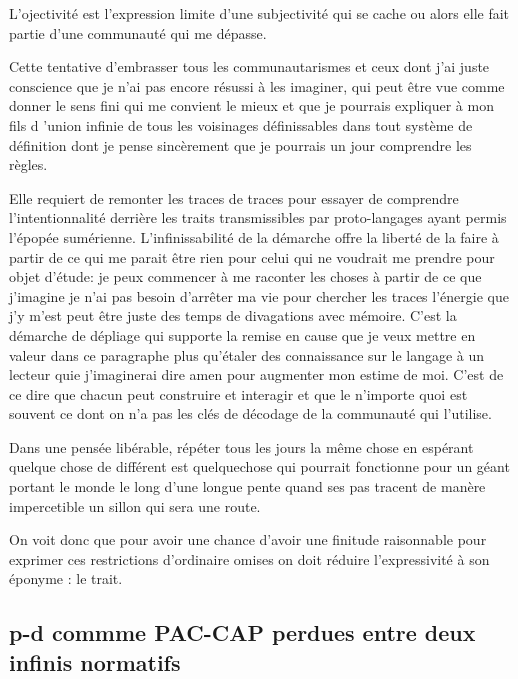 \documentclass{article}
\begin{document}
L'ojectivité est l'expression limite d'une subjectivité qui se cache ou alors elle fait partie d'une communauté qui me dépasse.  

Cette tentative d'embrasser tous les communautarismes et ceux dont j'ai juste conscience que je n'ai pas encore résussi à les imaginer, qui peut être vue comme donner le  sens fini qui me convient le mieux  et que je pourrais expliquer à mon fils d 'union infinie de tous les voisinages définissables dans tout système de définition dont je pense sincèrement que je  pourrais un jour comprendre les règles. 

Elle requiert  de remonter les traces de traces  pour essayer de comprendre l'intentionnalité derrière les traits transmissibles par proto-langages ayant permis l'épopée sumérienne. L'infinissabilité de la démarche offre la liberté de la faire à partir de ce qui me parait être rien pour celui qui ne voudrait me prendre pour objet d'étude: je peux commencer à me raconter les choses à partir de ce que j'imagine je n'ai pas besoin d'arrêter ma vie pour chercher les traces l'énergie que j'y m'est peut être juste des temps de divagations avec mémoire. C'est la démarche de dépliage qui supporte la remise en cause que je veux mettre en valeur dans ce paragraphe plus qu'étaler des connaissance sur le langage à un lecteur quie j'imaginerai dire amen pour augmenter mon estime de moi. C'est de ce dire que chacun peut construire et interagir et que le n'importe quoi est souvent ce dont on n'a pas les clés de décodage de la communauté qui l'utilise.  

Dans une pensée libérable, répéter tous les jours la même chose en espérant quelque chose de différent est quelquechose qui pourrait fonctionne pour un géant portant le monde le long d'une longue pente quand ses pas tracent de manère impercetible un sillon qui sera une route. 

On voit donc que pour avoir une chance d'avoir une finitude raisonnable pour exprimer ces restrictions d'ordinaire omises on doit réduire l'expressivité à son éponyme : le trait.

\subsection{p-d commme PAC-CAP perdues entre deux infinis normatifs}
\end{document}
